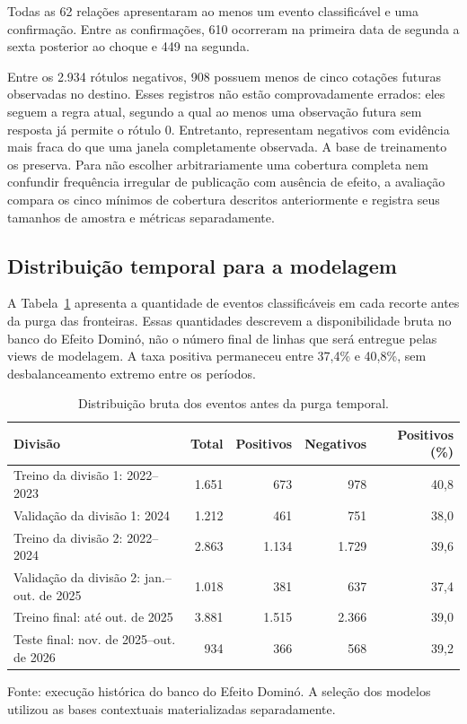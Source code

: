 \documentclass[12pt,a4paper]{article}
\begin{document}
Todas as 62 relações apresentaram ao menos um evento classificável e uma
confirmação. Entre as confirmações, 610 ocorreram na primeira data de segunda a
sexta posterior ao choque e 449 na segunda.

Entre os 2.934 rótulos negativos, 908 possuem menos de cinco cotações futuras
observadas no destino. Esses registros não estão comprovadamente errados: eles
seguem a regra atual, segundo a qual ao menos uma observação futura sem resposta
já permite o rótulo 0. Entretanto, representam negativos com evidência mais
fraca do que uma janela completamente observada. A base de treinamento os
preserva. Para não escolher arbitrariamente uma cobertura completa nem confundir
frequência irregular de publicação com ausência de efeito, a avaliação compara
os cinco mínimos de cobertura descritos anteriormente e registra seus tamanhos
de amostra e métricas separadamente.

\subsection{Distribuição temporal para a modelagem}

A Tabela~\ref{tab:divisoes-modelagem} apresenta a quantidade de eventos
classificáveis em cada recorte antes da purga das fronteiras. Essas quantidades
descrevem a disponibilidade bruta no banco do Efeito Dominó, não o número final
de linhas que será entregue pelas views de modelagem. A taxa positiva permaneceu
entre 37,4\% e 40,8\%, sem desbalanceamento extremo entre os períodos.

\begin{table}[htbp]
    \centering
    \caption{Distribuição bruta dos eventos antes da purga temporal.}
    \label{tab:divisoes-modelagem}
    \scriptsize
    \begin{tabular}{p{5.4cm}rrrr}
        \toprule
        \textbf{Divisão} & \textbf{Total} & \textbf{Positivos} &
        \textbf{Negativos} & \textbf{Positivos (\%)} \\
        \midrule
        Treino da divisão 1: 2022--2023 & 1.651 & 673 & 978 & 40,8 \\
        Validação da divisão 1: 2024 & 1.212 & 461 & 751 & 38,0 \\
        Treino da divisão 2: 2022--2024 & 2.863 & 1.134 & 1.729 & 39,6 \\
        Validação da divisão 2: jan.--out. de 2025 & 1.018 & 381 & 637 & 37,4 \\
        Treino final: até out. de 2025 & 3.881 & 1.515 & 2.366 & 39,0 \\
        Teste final: nov. de 2025--out. de 2026 & 934 & 366 & 568 & 39,2 \\
        \bottomrule
    \end{tabular}

    \par\smallskip
    \footnotesize
    Fonte: execução histórica do banco do Efeito Dominó. A seleção dos modelos
    utilizou as bases contextuais materializadas separadamente.
\end{table}
\end{document}
